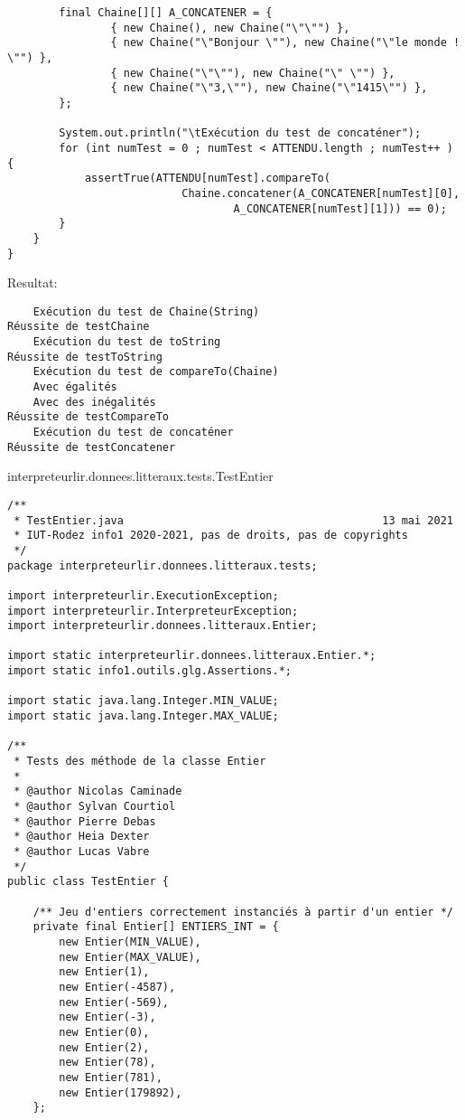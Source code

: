 \begin{enum}
\begin{verbatim}
        final Chaine[][] A_CONCATENER = {
                { new Chaine(), new Chaine("\"\"") },   
                { new Chaine("\"Bonjour \""), new Chaine("\"le monde ! \"") },
                { new Chaine("\"\""), new Chaine("\" \"") },
                { new Chaine("\"3,\""), new Chaine("\"1415\"") },
        };

        System.out.println("\tExécution du test de concaténer");
        for (int numTest = 0 ; numTest < ATTENDU.length ; numTest++ ) {
            assertTrue(ATTENDU[numTest].compareTo(
                           Chaine.concatener(A_CONCATENER[numTest][0], 
                                   A_CONCATENER[numTest][1])) == 0);
        }
    }
}
\end{verbatim}
Resultat:
\begin{verbatim}
    Exécution du test de Chaine(String)
Réussite de testChaine
    Exécution du test de toString
Réussite de testToString
    Exécution du test de compareTo(Chaine)
    Avec égalités
    Avec des inégalités
Réussite de testCompareTo
    Exécution du test de concaténer
Réussite de testConcatener
\end{verbatim}

    \item interpreteurlir.donnees.litteraux.tests.TestEntier
\begin{verbatim}
/**
 * TestEntier.java                                        13 mai 2021
 * IUT-Rodez info1 2020-2021, pas de droits, pas de copyrights
 */
package interpreteurlir.donnees.litteraux.tests;

import interpreteurlir.ExecutionException;
import interpreteurlir.InterpreteurException;
import interpreteurlir.donnees.litteraux.Entier;

import static interpreteurlir.donnees.litteraux.Entier.*;
import static info1.outils.glg.Assertions.*;

import static java.lang.Integer.MIN_VALUE;
import static java.lang.Integer.MAX_VALUE;

/** 
 * Tests des méthode de la classe Entier
 * 
 * @author Nicolas Caminade
 * @author Sylvan Courtiol
 * @author Pierre Debas
 * @author Heia Dexter
 * @author Lucas Vabre
 */
public class TestEntier {

    /** Jeu d'entiers correctement instanciés à partir d'un entier */
    private final Entier[] ENTIERS_INT = {
        new Entier(MIN_VALUE),
        new Entier(MAX_VALUE),
        new Entier(1),
        new Entier(-4587),
        new Entier(-569),
        new Entier(-3),
        new Entier(0),
        new Entier(2),
        new Entier(78),
        new Entier(781),
        new Entier(179892),
    };
    

\end{verbatim}
\end{enum}
